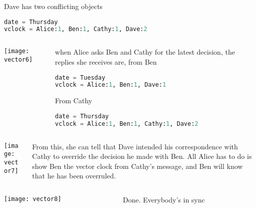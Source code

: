 \documentclass[aspectratio=169, 15pt,usenames,dvipsnames]{beamer}
\begin{document}
{\begin{gdblank}
\begin{columns}
\begin{column}{0.5\textwidth}
			Dave has two conflicting objects
			\begin{lstlisting}[language=Python]
date = Thursday
vclock = Alice:1, Ben:1, Cathy:1, Dave:2
			\end{lstlisting}
		\end{column}	
	\end{columns} 
	\end{gdblank}
	\cprotEnv\begin{gdblank}
	\begin{columns}
		\begin{column}{0.5\textwidth}
			\texttt{[image: vector6]}			
		\end{column}
		\begin{column}{0.5\textwidth}				
			when Alice asks Ben and Cathy for the latest decision, the replies she receives are, from Ben
			\begin{lstlisting}[language=Python]
date = Tuesday
vclock = Alice:1, Ben:1, Dave:1
			\end{lstlisting}
			From Cathy
			\begin{lstlisting}[language=Python]
date = Thursday
vclock = Alice:1, Ben:1, Cathy:1, Dave:2
			\end{lstlisting}
		\end{column}	
	\end{columns} 
	\end{gdblank}
	\cprotEnv\begin{gdblank}
	\begin{columns}
		\begin{column}{0.5\textwidth}
			\texttt{[image: vector7]}			
		\end{column}
		\begin{column}{0.5\textwidth}				
			From this, she can tell that Dave intended his correspondence with Cathy to override the decision he made with Ben. All Alice has to do is show Ben the vector clock from Cathy’s message, and Ben will know that he has been overruled.
		\end{column}	
	\end{columns} 
	\end{gdblank}
	\cprotEnv\begin{gdblank}
	\begin{columns}
		\begin{column}{0.5\textwidth}
			\texttt{[image: vector8]}			
		\end{column}
		\begin{column}{0.5\textwidth}				
			Done. Everybody's in sync

\end{column}
\end{columns}
\end{gdblank}}
\end{document}
